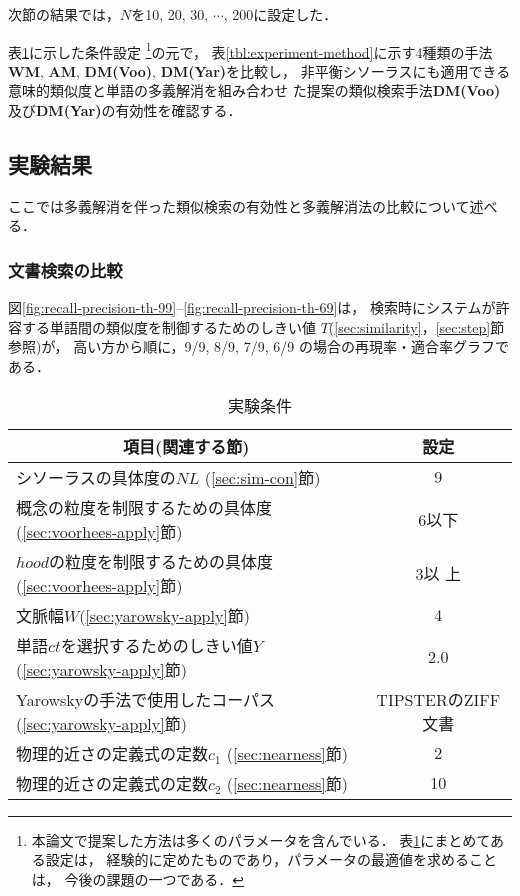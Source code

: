 次節の結果では，$N$を10, 20, 30, $\cdots$, 200に設定した．

表\ref{tbl:experiment-condition}に示した条件設定
\footnote{本論文で提案した方法は多くのパラメータを含んでいる．
表\ref{tbl:experiment-condition}にまとめてある設定は，
経験的に定めたものであり，パラメータの最適値を求めることは，
今後の課題の一つである．
}の元で，
表\ref{tbl:experiment-method}に示す4種類の手法
{\bf WM}, {\bf AM}, {\bf DM(Voo)}, {\bf DM(Yar)}を比較し，
非平衡シソーラスにも適用できる意味的類似度と単語の多義解消を組み合わせ
た提案の類似検索手法{\bf DM(Voo)}及び{\bf DM(Yar)}の有効性を確認する． 

\subsection{実験結果}
ここでは多義解消を伴った類似検索の有効性と多義解消法の比較について述べる．

\subsubsection{文書検索の比較}
 図\ref{fig:recall-precision-th-99}--\ref{fig:recall-precision-th-69}は，
検索時にシステムが許容する単語間の類似度を制御するためのしきい値
$T$(\ref{sec:similarity}，\ref{sec:step}節参照)が，
高い方から順に，9/9, 8/9, 7/9, 6/9 の場合の再現率・適合率グラフである．

\begin{table}[t]
\caption{実験条件}
\label{tbl:experiment-condition}
\small
\begin{center}
\renewcommand{\arraystretch}{}
\begin{tabular}{|l|c|}\hline
 \multicolumn{1}{|c|}{項目(関連する節)} & 設定 \\\hline\hline
 シソーラスの具体度の$NL$ (\ref{sec:sim-con}節) & 9  \\\hline\hline
 概念の粒度を制限するための具体度
 (\ref{sec:voorhees-apply}節) &
    6以下 \\\hline
 $hood$の粒度を制限するための具体度 (\ref{sec:voorhees-apply}節) & 3以
 上 \\\hline\hline 
 文脈幅$W$(\ref{sec:yarowsky-apply}節) &   {4} \\\hline 
 単語$ct$を選択するためのしきい値$Y$ (\ref{sec:yarowsky-apply}節) &
   {2.0} \\\hline
 Yarowskyの手法で使用したコーパス (\ref{sec:yarowsky-apply}節) & TIPSTERのZIFF文書\footnotemark
 \\\hline\hline
 物理的近さの定義式の定数$c_1$ (\ref{sec:nearness}節) & 2 \\\hline
 物理的近さの定義式の定数$c_2$ (\ref{sec:nearness}節) & 10 \\\hline
\end{tabular}
\end{center}
\end{table}

